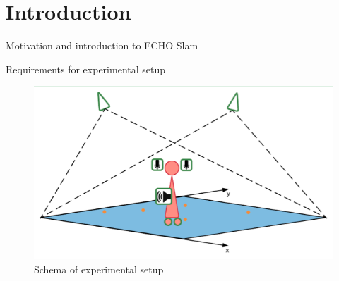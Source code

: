 \section{Introduction}


Motivation and introduction to ECHO Slam

Requirements for experimental setup

\begin{figure}[H]
    \centering
    \includegraphics[width=.6\linewidth]{files/Setup.png}
    \caption{Schema of experimental setup}
    \label{fig:setup}
\end{figure}
